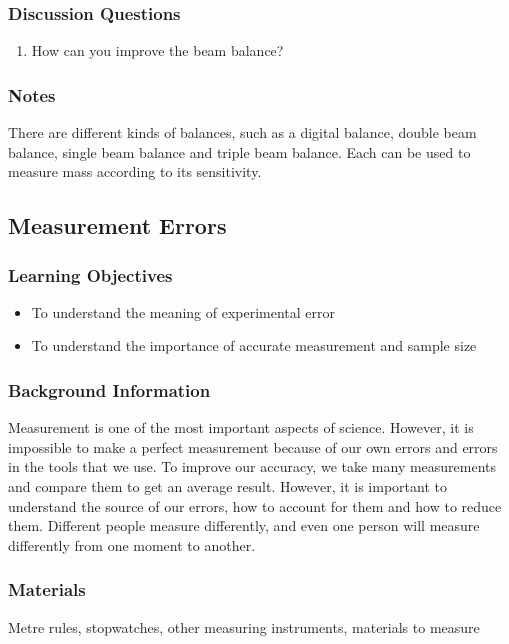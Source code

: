 \subsubsection*{Discussion Questions}
\begin{enumerate}
\item{How can you improve the beam balance?}
\end{enumerate}

\subsubsection*{Notes}
There are different kinds of balances, such as a digital balance, double beam balance, single beam balance and triple beam balance. Each can be used to measure mass according to its sensitivity.

\subsection{Measurement Errors}

\subsubsection*{Learning Objectives}
\begin{itemize}
\item{To understand the meaning of experimental error}
\item{To understand the importance of accurate measurement and sample size}
\end{itemize}

\subsubsection*{Background Information}
Measurement is one of the most important aspects of science. However, it is impossible to make a perfect measurement because of our own errors and errors in the tools that we use. To improve our accuracy, we take many measurements and compare them to get an average result. However, it is important to understand the source of our errors, how to account for them and how to reduce them. Different people measure differently, and even one person will measure differently from one moment to another.

\subsubsection*{Materials}
Metre rules, stopwatches, other measuring instruments, materials to measure

